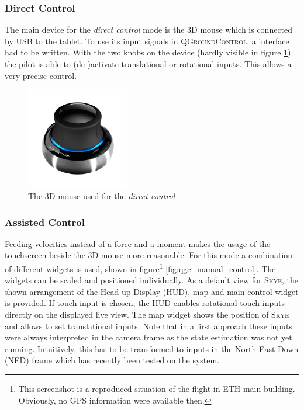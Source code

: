 \subsubsection{Direct Control}
The main device for the \textit{direct control} mode is the 3D mouse which is connected by USB to the tablet. To use its input signals in  \textsc{QGroundControl}, a interface had to be written. With the two knobs on the device (hardly visible in figure \ref{fig:3D_mouse}) the pilot is able to (de-)activate translational or rotational inputs. This allows a very precise control.

\begin{figure}[H] %
	\begin{center}
		\includegraphics[width=0.4\textwidth]{3dx_productimage}
		\caption{The 3D mouse used for the \textit{direct control}}  
		\label{fig:3D_mouse}
	\end{center}
\end{figure}

\subsubsection{Assisted Control}
\label{subsub:assistedcontrol}
Feeding velocities instead of a force and a moment makes the usage of the touchscreen beside the 3D mouse more reasonable. For this mode a combination of different widgets is used, shown in figure\footnote{This screenshot is a reproduced situation of the flight in ETH main building. Obviously, no GPS information were available then.} \ref{fig:qgc_manual_control}. The widgets can be scaled and positioned individually. As a default view for \textsc{Skye}, the shown arrangement of the Head-up-Display (HUD), map and main control widget is provided. If touch input is chosen, the HUD enables rotational touch inputs directly on the displayed live view. The map widget shows the position of \textsc{Skye} and allows to set translational inputs. Note that in a first approach these inputs were always interpreted in the camera frame as the state estimation was not yet running. Intuitively, this has to be transformed to inputs in the North-East-Down (NED) frame which has recently been tested on the system.

